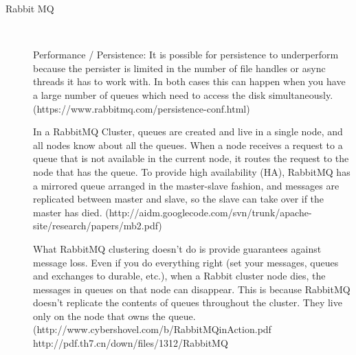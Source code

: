 \begin{description}
    \item [Rabbit MQ] \hfill \\
    {
    Performance / Persistence:
    It is possible for persistence to underperform because the persister is
    limited in the number of file handles or async threads it has to work with.
    In both cases this can happen when you have a large number of queues which
    need to access the disk simultaneously. 
    (https://www.rabbitmq.com/persistence-conf.html)


    In a RabbitMQ Cluster, queues are
    created and live in a single node, and all nodes know about
    all the queues. When a node receives a request to a queue
    that is not available in the current node, it routes the request
    to the node that has the queue.
    To provide high availability
    (HA), RabbitMQ has a mirrored queue arranged in the
    master-slave fashion, and messages are replicated between
    master and slave, so the slave can take over if the master
    has died.
    (http://aidm.googlecode.com/svn/trunk/apache-site/research/papers/mb2.pdf)

    What RabbitMQ clustering doesn't do is provide guarantees against message loss.
    Even if you do everything right (set your messages, queues and exchanges to
    durable, etc.), when a Rabbit cluster node dies, the messages in queues on that
    node can disappear. This is because RabbitMQ doesn't replicate the contents
    of queues throughout the cluster. They live only on the node that owns the
    queue.
    (http://www.cybershovel.com/b/RabbitMQinAction.pdf
    http://pdf.th7.cn/down/files/1312/RabbitMQ%

}
\end{description}
